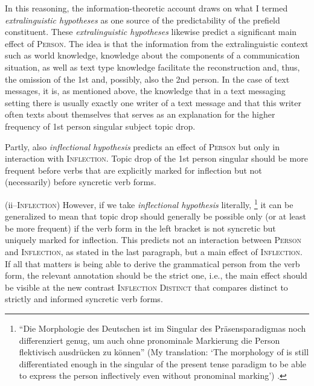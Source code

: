 In this reasoning, the information-theoretic  account draws on what I termed \textit{extralinguistic hypotheses} as one source of the predictability  of the prefield constituent.
These \textit{extralinguistic hypotheses} likewise predict a significant main effect of \textsc{Person}.
The idea is that the information from the extralinguistic context such as world knowledge, knowledge about the components of a communication situation, as well as text type knowledge facilitate the reconstruction and, thus, the omission of the 1st and, possibly, also the 2nd person.
In the case of text messages, it is, as mentioned above, the knowledge that in a text messaging setting there is usually exactly one writer of a text message and that this writer often texts about themselves that serves as an explanation for the higher frequency of 1st person singular subject topic drop.

Partly, also  \textit{inflectional hypothesis} predicts an effect of \textsc{Person} but only in interaction with \textsc{Inflection}.
Topic drop of the 1st person singular should be more frequent before verbs that are explicitly marked for inflection but not (necessarily) before syncretic verb forms.

(ii--\textsc{Inflection})
However, if we take  \textit{inflectional hypothesis} literally,%
\footnote{``Die Morphologie des Deutschen ist im Singular des Präsensparadigmas noch differenziert genug, um auch ohne pronominale Markierung die Person flektivisch ausdrücken zu können'' (My translation: `The morphology of  is still differentiated enough in the singular of the present tense paradigm to be able to express the person inflectively even without pronominal marking') \citep[198]{auer1993}.}
%
it can be generalized to mean that topic drop should generally be possible only (or at least be more frequent) if the verb form in the left bracket is not syncretic but uniquely marked for inflection.
This predicts not an interaction between \textsc{Person} and \textsc{Inflection}, as stated in the last paragraph, but a main effect of \textsc{Inflection}.
If all that matters is being able to derive the grammatical person from the verb form, the relevant annotation should be the strict one, i.e., the main effect should be visible at the new contrast \textsc{Inflection Distinct} that compares distinct to strictly and informed syncretic verb forms.

